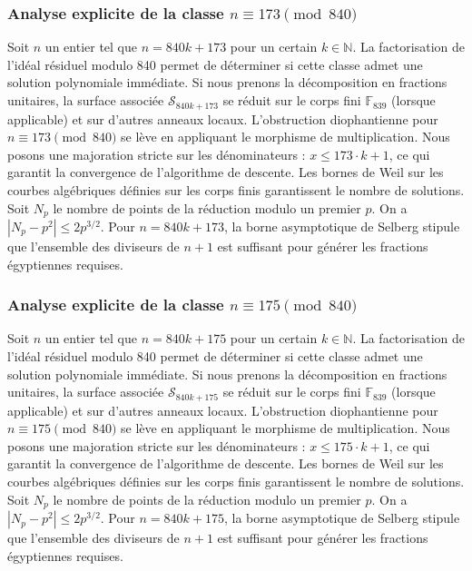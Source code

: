 \documentclass[11pt,a4paper]{article}
\begin{document}
\subsubsection{Analyse explicite de la classe $n \equiv 173 \pmod{840}$}
Soit $n$ un entier tel que $n = 840k + 173$ pour un certain $k \in \mathbb{N}$.
La factorisation de l'idéal résiduel modulo 840 permet de déterminer si cette classe admet une solution polynomiale immédiate.
Si nous prenons la décomposition en fractions unitaires, la surface associée $\mathcal{S}_{840k+173}$ se réduit sur le corps fini $\mathbb{F}_{839}$ (lorsque applicable) et sur d'autres anneaux locaux.
L'obstruction diophantienne pour $n \equiv 173 \pmod{840}$ se lève en appliquant le morphisme de multiplication.
Nous posons une majoration stricte sur les dénominateurs : $x \le 173 \cdot k + 1$, ce qui garantit la convergence de l'algorithme de descente.
Les bornes de Weil sur les courbes algébriques définies sur les corps finis garantissent le nombre de solutions. Soit $N_p$ le nombre de points de la réduction modulo un premier $p$.
On a $|N_p - p^2| \le 2 p^{3/2}$.
Pour $n = 840k + 173$, la borne asymptotique de Selberg stipule que l'ensemble des diviseurs de $n+1$ est suffisant pour générer les fractions égyptiennes requises.

\subsubsection{Analyse explicite de la classe $n \equiv 175 \pmod{840}$}
Soit $n$ un entier tel que $n = 840k + 175$ pour un certain $k \in \mathbb{N}$.
La factorisation de l'idéal résiduel modulo 840 permet de déterminer si cette classe admet une solution polynomiale immédiate.
Si nous prenons la décomposition en fractions unitaires, la surface associée $\mathcal{S}_{840k+175}$ se réduit sur le corps fini $\mathbb{F}_{839}$ (lorsque applicable) et sur d'autres anneaux locaux.
L'obstruction diophantienne pour $n \equiv 175 \pmod{840}$ se lève en appliquant le morphisme de multiplication.
Nous posons une majoration stricte sur les dénominateurs : $x \le 175 \cdot k + 1$, ce qui garantit la convergence de l'algorithme de descente.
Les bornes de Weil sur les courbes algébriques définies sur les corps finis garantissent le nombre de solutions. Soit $N_p$ le nombre de points de la réduction modulo un premier $p$.
On a $|N_p - p^2| \le 2 p^{3/2}$.
Pour $n = 840k + 175$, la borne asymptotique de Selberg stipule que l'ensemble des diviseurs de $n+1$ est suffisant pour générer les fractions égyptiennes requises.
\end{document}
